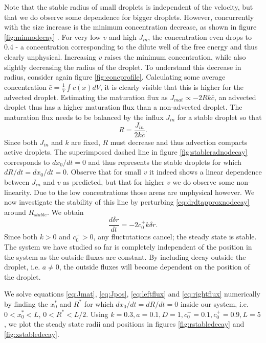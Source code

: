 \documentclass{Dissertate}
\begin{document}
Note that the stable radius of small droplets is independent of the
velocity, but that we do observe some dependence for bigger droplets.
However, concurrently with the size increase is the minimum
concentration decrease, as shown in figure \ref{fig:minnodecay} .
For very low \(v\) and high \(J_{in}\), the concentration even drops to
0.4 - a concentration corresponding to the dilute well of the free
energy and thus clearly unphysical. Increasing \(v\) raises the minimum
concentration, while also slightly decreasing the radius of the droplet.
To understand this decrease in radius, consider again figure
\ref{fig:concprofile}. Calculating some average concentration
\(\bar{c}=\frac{1}{V}\int c(x)dV\), it is clearly visible that this is
higher for the advected droplet. Estimating the maturation flux as
\(J_{mat}\propto -2Rk\bar{c}\), an advected droplet thus has a higher
maturation flux than a non-advected droplet. The maturation flux needs
to be balanced by the influx \(J_{in}\) for a stable droplet so that
\begin{equation}
R = \frac{J_{in}}{2k\bar{c}}.
\label{eq:jmathandwavy}\end{equation} Since both \(J_{in}\) and \(k\)
are fixed, \(R\) must decrease and thus advection compacts active
droplets. The superimposed dashed line in figure
\ref{fig:stableradnodecay} corresponds to \(dx_0/dt=0\) and thus
represents the stable droplets for which \(dR/dt=dx_0/dt=0\). Observe
that for small \(v\) it indeed shows a linear dependence between
\(J_{in}\) and \(v\) as predicted, but that for higher \(v\) we do
observe some non-linearity. Due to the low concentrations those areas
are unphysical however. We now investigate the stability of this line by
perturbing \ref{eq:drdtapproxnodecay} around \(R_{stable}\). We
obtain \[
\frac{d\delta r}{dt}=-2c_0^+k\delta r.
\] Since both \(k>0\) and \(c_0^+>0\), any fluctutations cancel; the
steady state is stable. The system we have studied so far is completely
independent of the position in the system as the outside fluxes are
constant. By including decay outside the droplet, i.e. \(a\neq 0\), the
outside fluxes will become dependent on the position of the droplet.

We solve equations \ref{eq:Jmat}, \ref{eq:Jpos},
\ref{eq:leftflux} and \ref{eq:rightflux} numerically by finding
the \(x_0^*\) and \(R^{*}\) for which \(dx_0/dt=dR/dt=0\) inside our
system, i.e. \(0<x_0^*<L\), \(0<R^*<L/2\). Using
\(k=0.3, a=0.1, D=1 ,c_0^-=0.1,c_0^+=0.9, L=5\) , we plot the steady
state radii and positions in figures \ref{fig:rstabledecay} and
\ref{fig:xstabledecay}.
\end{document}
